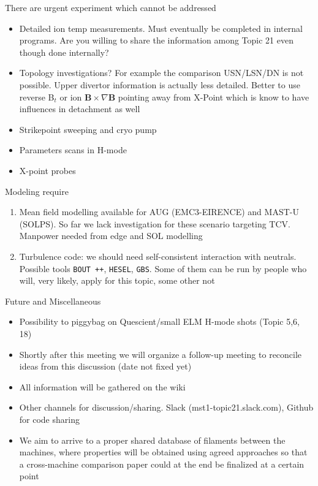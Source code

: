 \documentclass[10pt, compress]{beamer}
\begin{document}
\begin{frame}{There are urgent experiment which cannot be addressed}
\begin{itemize}
	\item Detailed ion temp measurements. Must eventually be
          completed in internal programs. Are you willing to share the
          information among Topic 21 even though done internally?
	\item Topology investigations? For example the comparison
          USN/LSN/DN is not possible. Upper divertor information is
          actually less detailed. Better to use reverse B$_t$ or ion
          $\mathbf{B}\times\nabla\mathbf{B}$ pointing away from
          X-Point which is know to have influences in detachment as
          well \parencite{McLean}
	\item Strikepoint sweeping and cryo pump
	\item Parameters scans in H-mode
	\item X-point probes
\end{itemize}
\end{frame}

\begin{frame}{Modeling require}
  \begin{enumerate}
    \item Mean field modelling available for AUG (EMC3-EIRENCE) and
      MAST-U (SOLPS). So far we lack investigation for these scenario
      targeting TCV. Manpower needed from edge and SOL modelling
    \item Turbulence code: we should need self-consistent interaction
      with neutrals. Possible tools \texttt{BOUT ++}, \texttt{HESEL},
      \texttt{GBS}. Some of them can be run by people who will, very
      likely, apply for this topic, some other not
  \end{enumerate}
\end{frame}

\begin{frame}{Future and Miscellaneous}
	\begin{itemize}
		\item Possibility to piggybag on Quescient/small ELM H-mode shots (Topic 5,6, 18)
		\item Shortly after this meeting we will organize a follow-up meeting to reconcile ideas
                  from this discussion (date not fixed yet)
		\item All information will be gathered on the wiki
                \item Other channels for discussion/sharing. Slack
                  (mst1-topic21.slack.com), Github for code sharing
		\item We aim to arrive to a proper shared database of
                  filaments between the machines, where properties
                  will be obtained using agreed approaches so that a
                  cross-machine comparison paper could at the end be
                  finalized at a certain point		
	\end{itemize}
\end{frame}
\end{document}
